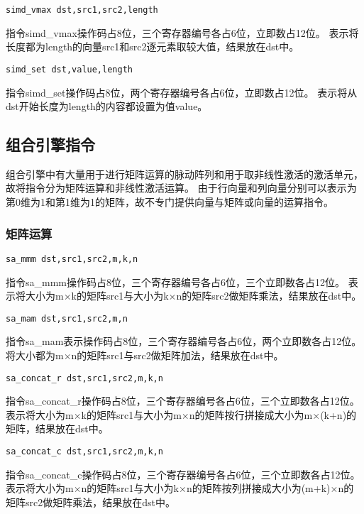 \begin{lstlisting}[language={[x86masm]Assembler}]
    simd_vmax dst,src1,src2,length
\end{lstlisting}
指令simd\_vmax操作码占8位，三个寄存器编号各占6位，立即数占12位。
表示将长度都为length的向量src1和src2逐元素取较大值，结果放在dst中。

\begin{lstlisting}[language={[x86masm]Assembler}]
    simd_set dst,value,length
\end{lstlisting}
指令simd\_set操作码占8位，两个寄存器编号各占6位，立即数占12位。
表示将从dst开始长度为length的内容都设置为值value。

\subsection{组合引擎指令}
组合引擎中有大量用于进行矩阵运算的脉动阵列和用于取非线性激活的激活单元，故将指令分为矩阵运算和非线性激活运算。
由于行向量和列向量分别可以表示为第0维为1和第1维为1的矩阵，故不专门提供向量与矩阵或向量的运算指令。

\subsubsection{矩阵运算}
\begin{lstlisting}[language={[x86masm]Assembler}] 
    sa_mmm dst,src1,src2,m,k,n
\end{lstlisting}
指令sa\_mmm操作码占8位，三个寄存器编号各占6位，三个立即数各占12位。
表示将大小为m$\times$k的矩阵src1与大小为k$\times$n的矩阵src2做矩阵乘法，结果放在dst中。

\begin{lstlisting}[language={[x86masm]Assembler}] 
    sa_mam dst,src1,src2,m,n
\end{lstlisting}
指令sa\_mam表示操作码占8位，三个寄存器编号各占6位，两个立即数各占12位。
将大小都为m$\times$n的矩阵src1与src2做矩阵加法，结果放在dst中。

\begin{lstlisting}[language={[x86masm]Assembler}] 
    sa_concat_r dst,src1,src2,m,k,n
\end{lstlisting}
指令sa\_concat\_r操作码占8位，三个寄存器编号各占6位，三个立即数各占12位。
表示将大小为m$\times$k的矩阵src1与大小为m$\times$n的矩阵按行拼接成大小为m$\times$(k+n)的矩阵，结果放在dst中。

\begin{lstlisting}[language={[x86masm]Assembler}] 
    sa_concat_c dst,src1,src2,m,k,n
\end{lstlisting}
指令sa\_concat\_c操作码占8位，三个寄存器编号各占6位，三个立即数各占12位。
表示将大小为m$\times$n的矩阵src1与大小为k$\times$n的矩阵按列拼接成大小为(m+k)$\times$n的矩阵src2做矩阵乘法，结果放在dst中。

